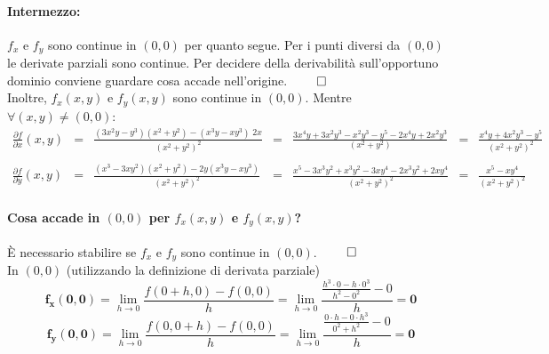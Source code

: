 \begin{example}
	\paragraph{Intermezzo:} $f_x$ e $f_y$ sono continue in $(0,0)$ per quanto segue. Per i punti diversi da $(0,0)$ le derivate parziali sono continue. Per decidere della derivabilità sull'opportuno dominio conviene guardare cosa accade nell'origine. $\qed$\\
	Inoltre, $f_x(x,y)$ e $f_y(x,y)$ sono continue in $(0,0)$. Mentre $\forall (x,y)\neq(0,0)$:
	\begin{equation*}
		\begin{matrix}
			\frac{\partial f}{\partial x}(x,y) &=& \frac{(3x^2y - y^3)(x^2+y^2) - (x^3y-xy^3)\; 2x}{(x^2+y^2)^2} &=& \frac{3x^4y+3x^2y^3-x^2y^3-y^5-2x^4y+2x^2y^3}{(x^2+y^2)}&=&\frac{x^4y+4x^2y^3-y^5}{(x^2+y^2)^2}\\\\
			\frac{\partial f}{\partial y}(x,y) &=& \frac{(x^3-3xy^2)(x^2+y^2)-2y(x^3y-xy^3)}{(x^2+y^2)^2}&=&\frac{x^5-3x^3y^2+x^3y^2-3xy^4-2x^3y^2+2xy^4}{(x^2+y^2)^2}&=&\frac{x^5-xy^4}{(x^2+y^2)^2}
		\end{matrix}
	\end{equation*}
	\paragraph{Cosa accade in $(0,0)$ per $f_x(x,y)$ e $f_y(x,y)$?} È necessario stabilire se $f_x$ e $f_y$ sono continue in $(0,0)$. $\qed$\\
	In $(0,0)$ (utilizzando la definizione di derivata parziale)
	\begin{equation*}
		\boldsymbol{f_x(0,0)}=\lim_{h\rightarrow 0}\frac{f(0+h, 0)-f(0,0)}{h} = \lim_{h\rightarrow 0} \frac{\frac{h^3\cdot 0 - h\cdot 0^3}{h^2-0^2} - 0}{h} = \boldsymbol{0}
	\end{equation*}
	\begin{equation*}
		\boldsymbol{f_y(0,0)} = \lim_{h\rightarrow 0} \frac{f(0,0+h)-f(0,0)}{h}= \lim_{h\rightarrow 0}\frac{\frac{0\cdot h- 0\cdot h^3}{0^2+h^2} - 0 }{h} = \boldsymbol{0}
	\end{equation*}

\end{example}
